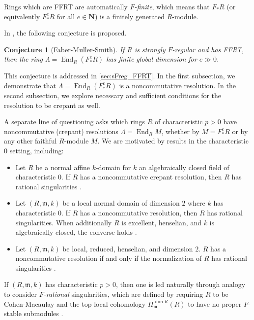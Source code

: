 \documentclass{amsart}
\newtheorem{conj}[thm]{Conjecture}
\theoremstyle{definition}
\def\fm{\mathfrak{m}}
\newcommand{\NN}{\mathbf N}
\DeclareMathOperator{\End}{\operatorname{End}}
\newcommand{\Fe}{F_{*}^{e}}
\begin{document}
Rings which are FFRT are automatically \emph{$F$-finite}, which means that $F_{*}R$ (or equivalently $\Fe R$ for all $e\in\NN$) is a finitely generated $R$-module.

\bigbreak

In \cite{FMS19}, the following conjecture is proposed.

\begin{conj}[Faber-Muller-Smith]\label{conj:FMS}
If $R$ is strongly $F$-regular and has FFRT, then the ring $\Lambda=\End_{R}(\Fe R)$ has finite global dimension for $e\gg0$.
\end{conj}

\noindent This conjecture is addressed in \cref{sec:sFreg_FFRT}. In the first subsection, we demonstrate that $\Lambda=\End_{R}(\Fe R)$ is a noncommutative resolution. In the second subsection, we explore necessary and sufficient conditions for the resolution to be crepant as well.

\bigbreak

A separate line of questioning asks which rings $R$ of characteristic $p>0$ have noncommutative (crepant) resolutions $\Lambda=\End_{R}M$, whether by $M=\Fe R$ or by any other faithful $R$-module $M$. We are motivated by results in the characteristic $0$ setting, including:

\begin{itemize}
\item Let $R$ be a normal affine $k$-domain for $k$ an algebraically closed field of characteristic $0$. If $R$ has a noncommutative crepant resolution, then $R$ has rational singularities \cite[Thm.\ ~1.1]{SVdB08}.
\item Let $(R,\fm,k)$ be a local normal domain of dimension $2$ where $k$ has characteristic $0$. If $R$ has a noncommutative resolution, then $R$ has rational singularities. When additionally $R$ is excellent, henselian, and $k$ is algebraically closed, the converse holds \cite[Cor.\ ~3.3]{DITV15}.
\item Let $(R,\fm,k)$ be local, reduced, henselian, and dimension $2$. $R$ has a noncommutative resolution if and only if the normalization of $R$ has rational singularities \cite[Thm.\ ~3.5]{DFI15}.
\end{itemize}

\bigbreak

If $(R,\fm,k)$ has characteristic $p>0$, then one is led naturally through analogy to consider \emph{$F$-rational} singularities, which are defined by requiring $R$ to be Cohen-Macaulay and the top local cohomology $H_{\fm}^{\dim R}(R)$ to have no proper $F$-stable submodules \cite[Thm.\ ~2.6]{Smi97}. 
\end{document}
